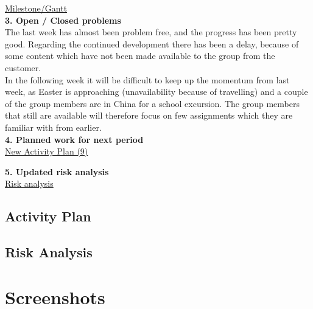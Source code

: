 \documentclass[12pt,a4paper,titlepage]{article}
\begin{document}
\begin{appendices}
\href{https://docs.google.com/spreadsheet/ccc?key=0AlhGbQmvU9bddHl2VWVjWHhiX3VMREc0NWY4UE5hd3c&usp=sharing}{Milestone/Gantt}\\[6pt]

\textbf{3. Open / Closed problems}\\

The last week has almost been problem free, and the progress has been pretty good. Regarding the continued development there has been a delay, because of some content which have not been made available to the group from the customer.\\

In the following week it will be difficult to keep up the momentum from last week, as Easter is approaching (unavailability because of travelling) and a couple of the group members are in China for a school excursion. The group members that still are available will therefore focus on few assignments which they are familiar with from earlier.\\[6pt]

\textbf{4. Planned work for next period}\\

\href{https://docs.google.com/spreadsheet/ccc?key=0AqgF_sCiXohadDQ4SlZKTTZ1ZWZ6djF2dllaZGRPSGc&usp=drive_web#gid=0}{New Activity Plan (9)}

\textbf{5. Updated risk analysis}\\

\href{https://docs.google.com/spreadsheet/ccc?key=0AlhGbQmvU9bddGs0M0tBd3ZaNUxvMnBaQnNLb0FoWnc&usp=drive_web#gid=0}{Risk analysis}

\clearpage

\subsection{Activity Plan}

\subsection{Risk Analysis}





\section{Screenshots}


\end{appendices}
\end{document}
